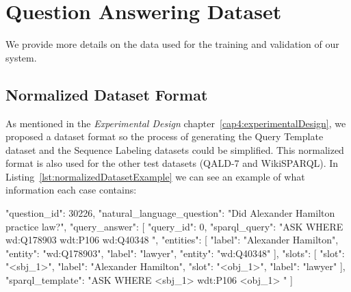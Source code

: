 \chapter{Question Answering Dataset}
\label{appendix:qaDataset}
We provide more details on the data used for the training and validation of our system.

\section{Normalized Dataset Format}
\label{appendix:qaDataset/normalizedFormat}
As mentioned in the \textit{Experimental Design} chapter~\ref{cap4:experimentalDesign}, we proposed 
a dataset format so the process 
of generating the Query Template dataset and the Sequence Labeling datasets could be simplified. This 
normalized format is also used for the other test datasets (QALD-7 and WikiSPARQL). In 
Listing~\ref{lst:normalizedDatasetExample} we can see an example of what information each case contains:

\begin{sparqlcode}[%
    caption={Example of one \LCQuADtwo{} case following our proposed normalized format.}, 
    label={lst:normalizedDatasetExample}]
    "question_id": 30226,
    "natural_language_question": "Did Alexander Hamilton practice law?",
    "query_answer": [
        {
            "query_id": 0,
            "sparql_query": 
                "ASK WHERE { wd:Q178903 wdt:P106 wd:Q40348 }",
            "entities": [ 
                {"label": "Alexander Hamilton", "entity": "wd:Q178903"},
                {"label": "lawyer", "entity": "wd:Q40348"}
            ],
            "slots": [
                {"slot": "<sbj_1>", "label": "Alexander Hamilton"},
                {"slot": "<obj_1>", "label": "lawyer"}
            ],
            "sparql_template": "ASK WHERE { <sbj_1> wdt:P106 <obj_1> }"
        }
    ]
\end{sparqlcode}

